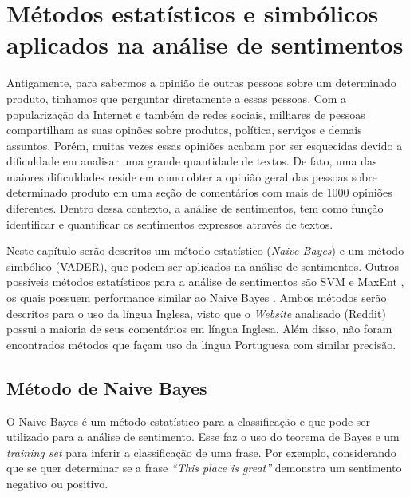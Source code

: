 \chapter{Métodos estatísticos e simbólicos aplicados na análise de sentimentos}
\label{cap:Classificadores}

Antigamente, para sabermos a opinião de outras pessoas sobre um
determinado produto, tinhamos que perguntar diretamente a essas pessoas. Com a
popularização da Internet e também de redes sociais, milhares de pessoas
compartilham as suas opinões sobre produtos, política, serviços e
demais assuntos. Porém, muitas vezes essas opiniões acabam
por ser esquecidas devido a dificuldade em analisar uma grande quantidade de
textos. De fato, uma das maiores dificuldades reside em como obter a opinião
geral das pessoas sobre determinado produto em uma seção de comentários com mais
de 1000 opiniões diferentes. Dentro dessa contexto, a análise de sentimentos,
tem como função identificar e quantificar os sentimentos expressos através de
textos.

Neste capítulo serão descritos um método estatístico (\textit{Naive Bayes}) e um
método simbólico (\ac{VADER}), que podem ser aplicados na análise de sentimentos.
Outros possíveis métodos estatísticos para a análise de sentimentos são \ac{SVM}
\cite{Hearst:1998:SVM:630302.630387} e \ac{MaxEnt}
\cite{Berger:1996:MEA:234285.234289}, os quais possuem performance similar ao Naive Bayes \cite{Pang:2002:TUS:1118693.1118704}. Ambos métodos serão descritos para o uso da língua Inglesa, visto que o \textit{Website} analisado (Reddit) possui a maioria de seus
comentários em língua Inglesa. Além disso, não foram encontrados métodos que
façam uso da língua Portuguesa com similar precisão.





\section{Método de Naive Bayes}

O Naive Bayes é um método estatístico para a classificação e que pode ser
utilizado para a análise de sentimento. Esse faz o uso do teorema de Bayes e um
\textit{training set} para inferir a classificação de uma frase. Por exemplo,
considerando que se quer determinar se a frase \textit{``This place is
great''} demonstra um sentimento negativo ou positivo.


